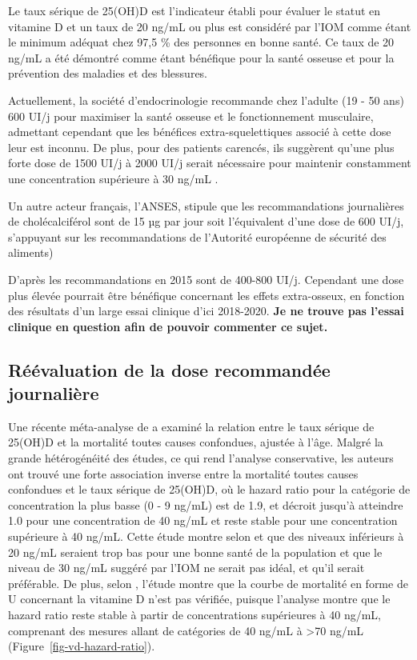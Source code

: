 \documentclass[
  a4paper,
  DIV=11,
  numbers=noendperiod,
  listof=totoc]{scrreprt}
\begin{document}
Le taux sérique de 25(OH)D est l'indicateur établi pour évaluer le
statut en vitamine D et un taux de 20 ng/mL ou plus est considéré par
l'IOM comme étant le minimum adéquat chez 97,5 \% des personnes en bonne
santé. Ce taux de 20 ng/mL a été démontré comme étant bénéfique pour la
santé osseuse et pour la prévention des maladies et des blessures.

Actuellement, la société d'endocrinologie recommande chez l'adulte (19 -
50 ans) 600 UI/j pour maximiser la santé osseuse et le fonctionnement
musculaire, admettant cependant que les bénéfices extra-squelettiques
associé à cette dose leur est inconnu. De plus, pour des patients
carencés, ils suggèrent qu'une plus forte dose de 1500 UI/j à 2000 UI/j
serait nécessaire pour maintenir constamment une concentration
supérieure à 30 ng/mL \autocite{Holick.2011}.

Un autre acteur français, l'ANSES, stipule que les recommandations
journalières de cholécalciférol sont de 15 µg par jour soit l'équivalent
d'une dose de 600 UI/j, s'appuyant sur les recommandations de l'Autorité
européenne de sécurité des aliments) \autocite{ANSES.2022}

D'après \textcite{Carmeliet.2015} les recommandations en 2015 sont de
400-800 UI/j. Cependant une dose plus élevée pourrait être bénéfique
concernant les effets extra-osseux, en fonction des résultats d'un large
essai clinique d'ici 2018-2020. \textbf{Je ne trouve pas l'essai
clinique en question afin de pouvoir commenter ce sujet.}

\hypertarget{ruxe9uxe9valuation-de-la-dose-recommanduxe9e-journaliuxe8re}{%
\subsection{Réévaluation de la dose recommandée
journalière}\label{ruxe9uxe9valuation-de-la-dose-recommanduxe9e-journaliuxe8re}}

Une récente méta-analyse de \textcite{Garland.2014} a examiné la
relation entre le taux sérique de 25(OH)D et la mortalité toutes causes
confondues, ajustée à l'âge. Malgré la grande hétérogénéité des études,
ce qui rend l'analyse conservative, les auteurs ont trouvé une forte
association inverse entre la mortalité toutes causes confondues et le
taux sérique de 25(OH)D, où le hazard ratio pour la catégorie de
concentration la plus basse (0 - 9 ng/mL) est de 1.9, et décroit jusqu'à
atteindre 1.0 pour une concentration de 40 ng/mL et reste stable pour
une concentration supérieure à 40 ng/mL. Cette étude montre selon
\textcite{Garland.2014} et \textcite{Papadimitriou.2017} que des niveaux
inférieurs à 20 ng/mL seraient trop bas pour une bonne santé de la
population et que le niveau de 30 ng/mL suggéré par l'IOM ne serait pas
idéal, et qu'il serait préférable. De plus, selon
\textcite{Papadimitriou.2017}, l'étude montre que la courbe de mortalité
en forme de U concernant la vitamine D n'est pas vérifiée, puisque
l'analyse montre que le hazard ratio reste stable à partir de
concentrations supérieures à 40 ng/mL, comprenant des mesures allant de
catégories de 40 ng/mL à \textgreater70 ng/mL
(Figure~\ref{fig-vd-hazard-ratio}).
\end{document}
